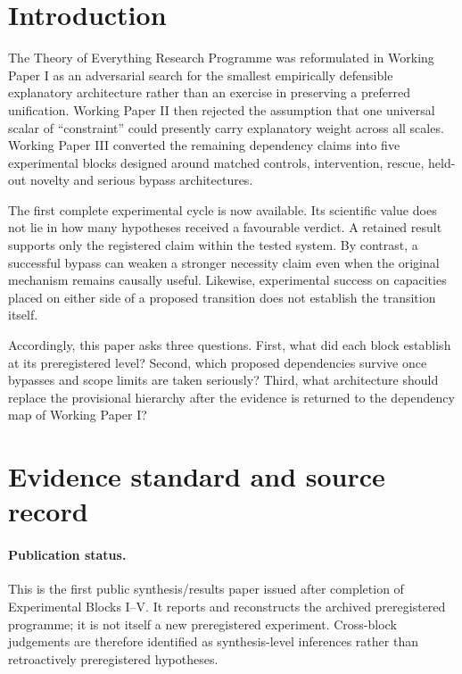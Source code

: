 \documentclass[11pt,a4paper]{article}
\begin{document}
\section{Introduction}

The Theory of Everything Research Programme was reformulated in Working Paper I as an adversarial search for the smallest empirically defensible explanatory architecture rather than an exercise in preserving a preferred unification. Working Paper II then rejected the assumption that one universal scalar of ``constraint'' could presently carry explanatory weight across all scales. Working Paper III converted the remaining dependency claims into five experimental blocks designed around matched controls, intervention, rescue, held-out novelty and serious bypass architectures.

The first complete experimental cycle is now available. Its scientific value does not lie in how many hypotheses received a favourable verdict. A retained result supports only the registered claim within the tested system. By contrast, a successful bypass can weaken a stronger necessity claim even when the original mechanism remains causally useful. Likewise, experimental success on capacities placed on either side of a proposed transition does not establish the transition itself.

Accordingly, this paper asks three questions. First, what did each block establish at its preregistered level? Second, which proposed dependencies survive once bypasses and scope limits are taken seriously? Third, what architecture should replace the provisional hierarchy after the evidence is returned to the dependency map of Working Paper I?

\section{Evidence standard and source record}

\paragraph{Publication status.}
This is the first public synthesis/results paper issued after completion of Experimental Blocks I--V. It reports and reconstructs the archived preregistered programme; it is not itself a new preregistered experiment. Cross-block judgements are therefore identified as synthesis-level inferences rather than retroactively preregistered hypotheses.
\end{document}
